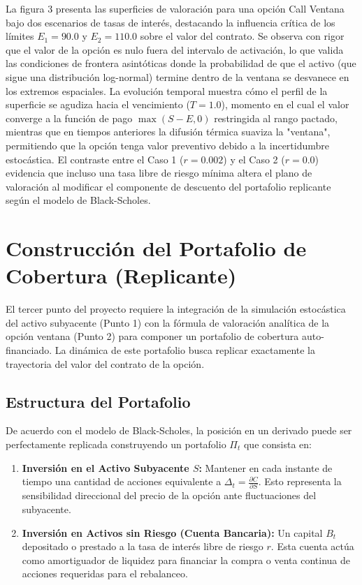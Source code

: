 \documentclass[12pt, a4paper]{article}
\begin{document}
La figura 3 presenta las superficies de valoración para una opción Call Ventana bajo dos escenarios de tasas de interés, destacando la influencia crítica de los límites $E_1=90.0$ y $E_2=110.0$ sobre el valor del contrato. Se observa con rigor que el valor de la opción es nulo fuera del intervalo de activación, lo que valida las condiciones de frontera asintóticas donde la probabilidad de que el activo (que sigue una distribución log-normal) termine dentro de la ventana se desvanece en los extremos espaciales. La evolución temporal muestra cómo el perfil de la superficie se agudiza hacia el vencimiento ($T=1.0$), momento en el cual el valor converge a la función de pago $\max(S-E, 0)$ restringida al rango pactado, mientras que en tiempos anteriores la difusión térmica suaviza la "ventana", permitiendo que la opción tenga valor preventivo debido a la incertidumbre estocástica. El contraste entre el Caso 1 ($r=0.002$) y el Caso 2 ($r=0.0$) evidencia que incluso una tasa libre de riesgo mínima altera el plano de valoración al modificar el componente de descuento del portafolio replicante según el modelo de Black-Scholes.

\section{Construcción del Portafolio de Cobertura (Replicante)}

El tercer punto del proyecto requiere la integración de la simulación estocástica del activo subyacente (Punto 1) con la fórmula de valoración analítica de la opción ventana (Punto 2) para componer un portafolio de cobertura auto-financiado. La dinámica de este portafolio busca replicar exactamente la trayectoria del valor del contrato de la opción.

\subsection{Estructura del Portafolio}

De acuerdo con el modelo de Black-Scholes, la posición en un derivado puede ser perfectamente replicada construyendo un portafolio $\Pi_t$ que consista en:
\begin{enumerate}
    \item \textbf{Inversión en el Activo Subyacente $S$:} Mantener en cada instante de tiempo una cantidad de acciones equivalente a $\Delta_t = \frac{\partial C}{\partial S}$. Esto representa la sensibilidad direccional del precio de la opción ante fluctuaciones del subyacente.
    \item \textbf{Inversión en Activos sin Riesgo (Cuenta Bancaria):} Un capital $B_t$ depositado o prestado a la tasa de interés libre de riesgo $r$. Esta cuenta actúa como amortiguador de liquidez para financiar la compra o venta continua de acciones requeridas para el rebalanceo.
\end{enumerate}
\end{document}
